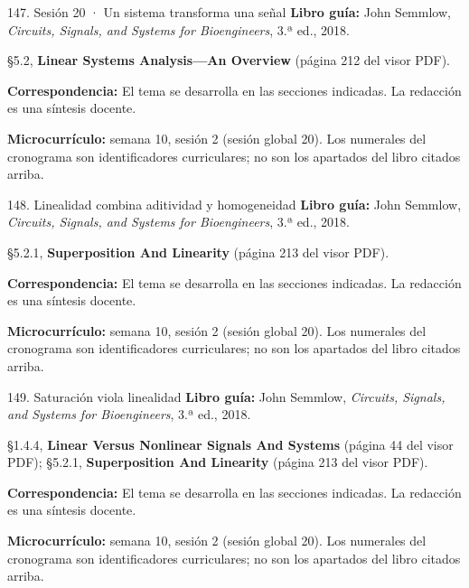 \documentclass[
  10pt,
  ignorenonframetext,
  aspectratio=169,
  spanish,
]{beamer}
\begin{document}
\begin{frame}{147. Sesión 20 · Un sistema transforma una señal}
\label{sesiuxf3n-20-un-sistema-transforma-una-seuxf1al}
\textbf{Libro guía:} John Semmlow, \emph{Circuits, Signals, and Systems
for Bioengineers}, 3.ª ed., 2018.

§5.2, \textbf{Linear Systems Analysis---An Overview} (página 212 del
visor PDF).

\textbf{Correspondencia:} El tema se desarrolla en las secciones
indicadas. La redacción es una síntesis docente.

\textbf{Microcurrículo:} semana 10, sesión 2 (sesión global 20). Los
numerales del cronograma son identificadores curriculares; no son los
apartados del libro citados arriba.
\end{frame}

\begin{frame}{148. Linealidad combina aditividad y homogeneidad}
\label{linealidad-combina-aditividad-y-homogeneidad}
\textbf{Libro guía:} John Semmlow, \emph{Circuits, Signals, and Systems
for Bioengineers}, 3.ª ed., 2018.

§5.2.1, \textbf{Superposition And Linearity} (página 213 del visor PDF).

\textbf{Correspondencia:} El tema se desarrolla en las secciones
indicadas. La redacción es una síntesis docente.

\textbf{Microcurrículo:} semana 10, sesión 2 (sesión global 20). Los
numerales del cronograma son identificadores curriculares; no son los
apartados del libro citados arriba.
\end{frame}

\begin{frame}{149. Saturación viola linealidad}
\label{saturaciuxf3n-viola-linealidad}
\textbf{Libro guía:} John Semmlow, \emph{Circuits, Signals, and Systems
for Bioengineers}, 3.ª ed., 2018.

§1.4.4, \textbf{Linear Versus Nonlinear Signals And Systems} (página 44
del visor PDF); §5.2.1, \textbf{Superposition And Linearity} (página 213
del visor PDF).

\textbf{Correspondencia:} El tema se desarrolla en las secciones
indicadas. La redacción es una síntesis docente.

\textbf{Microcurrículo:} semana 10, sesión 2 (sesión global 20). Los
numerales del cronograma son identificadores curriculares; no son los
apartados del libro citados arriba.
\end{frame}
\end{document}
